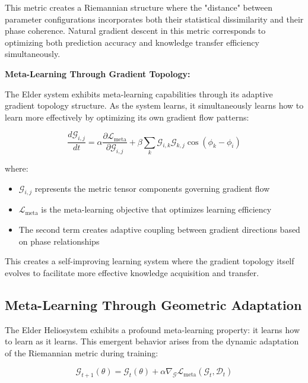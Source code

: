 This metric creates a Riemannian structure where the "distance" between parameter configurations incorporates both their statistical dissimilarity and their phase coherence. Natural gradient descent in this metric corresponds to optimizing both prediction accuracy and knowledge transfer efficiency simultaneously.

\textbf{Meta-Learning Through Gradient Topology:}

The Elder system exhibits meta-learning capabilities through its adaptive gradient topology structure. As the system learns, it simultaneously learns how to learn more effectively by optimizing its own gradient flow patterns:

\begin{equation}
\frac{d\mathcal{G}_{i,j}}{dt} = \alpha \frac{\partial \mathcal{L}_{\text{meta}}}{\partial \mathcal{G}_{i,j}} + \beta \sum_{k} \mathcal{G}_{i,k} \mathcal{G}_{k,j} \cos(\phi_k - \phi_i)
\end{equation}

where:
\begin{itemize}
    \item $\mathcal{G}_{i,j}$ represents the metric tensor components governing gradient flow
    \item $\mathcal{L}_{\text{meta}}$ is the meta-learning objective that optimizes learning efficiency
    \item The second term creates adaptive coupling between gradient directions based on phase relationships
\end{itemize}

This creates a self-improving learning system where the gradient topology itself evolves to facilitate more effective knowledge acquisition and transfer.

\subsection{Meta-Learning Through Geometric Adaptation}

The Elder Heliosystem exhibits a profound meta-learning property: it learns how to learn as it learns. This emergent behavior arises from the dynamic adaptation of the Riemannian metric during training:

\begin{equation}
\mathcal{G}_{t+1}(\theta) = \mathcal{G}_t(\theta) + \alpha \nabla_{\mathcal{G}} \mathcal{L}_{\text{meta}}(\mathcal{G}_t, \mathcal{D}_t)
\end{equation}

